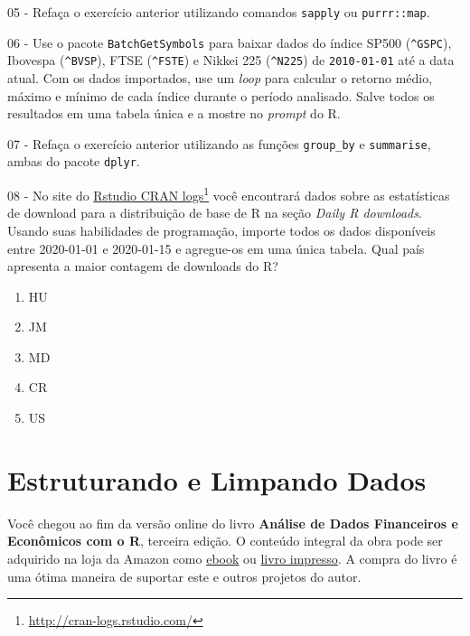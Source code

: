 \documentclass[
  11pt,
]{book}
\providecommand{\tightlist}{%
  \setlength{\itemsep}{0pt}\setlength{\parskip}{0pt}}
\newenvironment{pleasebuyit}
{\begin{noteblock}
		
	} {\end{noteblock}}
\begin{document}
05 -
Refaça o exercício anterior utilizando comandos \texttt{sapply} ou \texttt{purrr::map}.

06 -
Use o pacote \texttt{BatchGetSymbols} para baixar dados do índice SP500 (\texttt{\textquotesingle{}\^{}GSPC\textquotesingle{}}), Ibovespa (\texttt{\textquotesingle{}\^{}BVSP\textquotesingle{}}), FTSE (\texttt{\textquotesingle{}\^{}FSTE\textquotesingle{}}) e Nikkei 225 (\texttt{\textquotesingle{}\^{}N225\textquotesingle{}}) de \texttt{\textquotesingle{}2010-01-01\textquotesingle{}} até a data atual. Com os dados importados, use um \emph{loop} para calcular o retorno médio, máximo e mínimo de cada índice durante o período analisado. Salve todos os resultados em uma tabela única e a mostre no \emph{prompt} do R.

07 -
Refaça o exercício anterior utilizando as funções \texttt{group\_by} e \texttt{summarise}, ambas do pacote \texttt{dplyr}.

08 -
No site do \href{http://cran-logs.rstudio.com/}{Rstudio CRAN logs}\footnote{\url{http://cran-logs.rstudio.com/}} você encontrará dados sobre as estatísticas de download para a distribuição de base de R na seção \emph{Daily R downloads}. Usando suas habilidades de programação, importe todos os dados disponíveis entre 2020-01-01 e 2020-01-15 e agregue-os em uma única tabela. Qual país apresenta a maior contagem de downloads do R?

\begin{enumerate}
\def\labelenumi{\alph{enumi})}
\tightlist
\item
  HU
\item
  JM
\item
  MD
\item
  CR
\item
  US
\end{enumerate}

\hypertarget{limpando-estruturando}{%
\chapter{Estruturando e Limpando Dados}\label{limpando-estruturando}}

\begin{pleasebuyit}
Você chegou ao fim da versão online do livro \textbf{Análise de Dados
Financeiros e Econômicos com o R}, terceira edição. O conteúdo integral
da obra pode ser adquirido na loja da Amazon como
\href{https://www.amazon.com.br/dp/B08WNC27ZY}{ebook} ou
\href{https://www.amazon.com/dp/B08WP8CCDB}{livro impresso}. A compra do
livro é uma ótima maneira de suportar este e outros projetos do autor.
\end{pleasebuyit}
\end{document}
